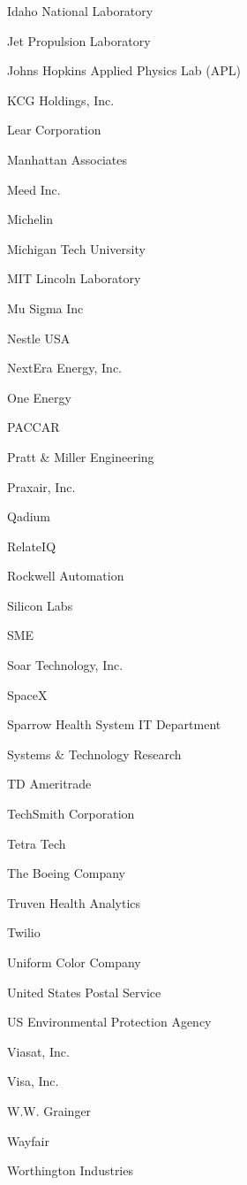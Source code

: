 \documentclass[twoside]{article}
\begin{document}
\begin{center}
\begin{multicols}{5}
\begin{FlushLeft}
\begin{compactitem}
\item Idaho National Laboratory
\item Jet Propulsion Laboratory
\item Johns Hopkins Applied Physics Lab (APL)
\item KCG Holdings, Inc.
\item Lear Corporation
\item Manhattan Associates
\item Meed Inc.
\item Michelin
\item Michigan Tech University
\item MIT Lincoln Laboratory
\item Mu Sigma Inc
\item Nestle USA
\item NextEra Energy, Inc.
\item One Energy
\item PACCAR
\item Pratt \& Miller Engineering
\item Praxair, Inc.
\item Qadium
\item RelateIQ
\item Rockwell Automation
\item Silicon Labs
\item SME
\item Soar Technology, Inc.
\item SpaceX
\item Sparrow Health System IT Department
\item Systems \& Technology Research
\item TD Ameritrade
\item TechSmith Corporation
\item Tetra Tech
\item The Boeing Company
\item Truven Health Analytics
\item Twilio
\item Uniform Color Company
\item United States Postal Service
\item US Environmental Protection Agency
\item Viasat, Inc.
\item Visa, Inc.
\item W.W. Grainger
\item Wayfair
\item Worthington Industries
\end{compactitem}

\end{FlushLeft}
\end{multicols}
\end{center}
\end{document}
